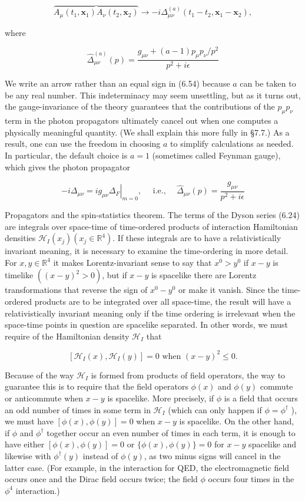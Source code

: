 \documentclass[10pt, letterpaper]{article}
\begin{document}
$$
\overbrace{A_{\mu}\left(t_{1}, \mathbf{x}_{1}\right) A_{\nu}\left(t_{2}, \mathbf{x}_{2}\right)} \longrightarrow-i \Delta_{\mu \nu}^{(a)}\left(t_{1}-t_{2}, \mathbf{x}_{1}-\mathbf{x}_{2}\right),
$$

where

$$
\widehat{\Delta}_{\mu \nu}^{(a)}(p)=\frac{g_{\mu \nu}+(a-1) p_{\mu} p_{\nu} / p^{2}}{p^{2}+i \epsilon}
$$

We write an arrow rather than an equal sign in (6.54) because $a$ can be taken to be any real number. This indeterminacy may seem unsettling, but as it turns out, the gauge-invariance of the theory guarantees that the contributions of the $p_{\mu} p_{\nu}$ term in the photon propagators ultimately cancel out when one computes a physically meaningful quantity. (We shall explain this more fully in §7.7.) As a result, one can use the freedom in choosing $a$ to simplify calculations as needed. In particular, the default choice is $a=1$ (sometimes called Feynman gauge), which gives the photon propagator

$$
-i \Delta_{\mu \nu}=\left.i g_{\mu \nu} \Delta_{F}\right|_{m=0}, \quad \text { i.e., } \quad \widehat{\Delta}_{\mu \nu}(p)=\frac{g_{\mu \nu}}{p^{2}+i \epsilon}
$$

Propagators and the spin-statistics theorem. The terms of the Dyson series (6.24) are integrals over space-time of time-ordered products of interaction Hamiltonian densities $\mathcal{H}_{I}\left(x_{j}\right)\left(x_{j} \in \mathbb{R}^{4}\right)$. If these integrals are to have a relativistically invariant meaning, it is necessary to examine the time-ordering in more detail. For $x, y \in \mathbb{R}^{4}$ it makes Lorentz-invariant sense to say that $x^{0}>y^{0}$ if $x-y$ is timelike $\left((x-y)^{2}>0\right)$, but if $x-y$ is spacelike there are Lorentz transformations that reverse the sign of $x^{0}-y^{0}$ or make it vanish. Since the time-ordered products are to be integrated over all space-time, the result will have a relativistically invariant meaning only if the time ordering is irrelevant when the space-time points in question are spacelike separated. In other words, we must require of the Hamiltonian density $\mathcal{H}_{I}$ that

$$
\left[\mathcal{H}_{I}(x), \mathcal{H}_{I}(y)\right]=0 \text { when }(x-y)^{2} \leq 0 .
$$

Because of the way $\mathcal{H}_{I}$ is formed from products of field operators, the way to guarantee this is to require that the field operators $\phi(x)$ and $\phi(y)$ commute or anticommute when $x-y$ is spacelike. More precisely, if $\phi$ is a field that occurs an odd number of times in some term in $\mathcal{H}_{I}$ (which can only happen if $\phi=\phi^{\dagger}$ ), we must have $[\phi(x), \phi(y)]=0$ when $x-y$ is spacelike. On the other hand, if $\phi$ and $\phi^{\dagger}$ together occur an even number of times in each term, it is enough to have either $[\phi(x), \phi(y)]=0$ or $\{\phi(x), \phi(y)\}=0$ for $x-y$ spacelike and likewise with $\phi^{\dagger}(y)$ instead of $\phi(y)$, as two minus signs will cancel in the latter case. (For example, in the interaction for QED, the electromagnetic field occurs once and the Dirac field occurs twice; the field $\phi$ occurs four times in the $\phi^{4}$ interaction.)
\end{document}
